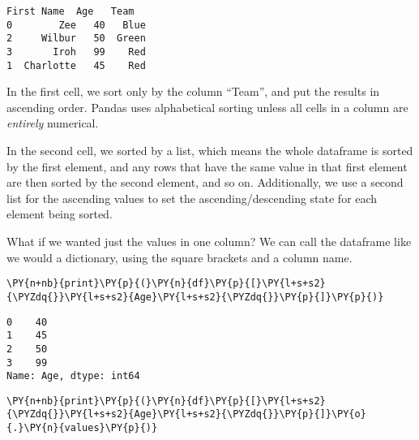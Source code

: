     
    \begin{Verbatim}[commandchars=\\\{\}]
  First Name  Age   Team
0        Zee   40   Blue
2     Wilbur   50  Green
3       Iroh   99    Red
1  Charlotte   45    Red
    \end{Verbatim}

    
    In the first cell, we sort only by the column ``Team'', and put the
results in ascending order. Pandas uses alphabetical sorting unless all
cells in a column are \emph{entirely} numerical.

In the second cell, we sorted by a list, which means the whole dataframe
is sorted by the first element, and any rows that have the same value in
that first element are then sorted by the second element, and so on.
Additionally, we use a second list for the ascending values to set the
ascending/descending state for each element being sorted.

What if we wanted just the values in one column? We can call the
dataframe like we would a dictionary, using the square brackets and a
column name.

    \begin{tcolorbox}[breakable, size=fbox, boxrule=1pt, pad at break*=1mm,colback=cellbackground, colframe=cellborder]
\begin{Verbatim}[commandchars=\\\{\}]
\PY{n+nb}{print}\PY{p}{(}\PY{n}{df}\PY{p}{[}\PY{l+s+s2}{\PYZdq{}}\PY{l+s+s2}{Age}\PY{l+s+s2}{\PYZdq{}}\PY{p}{]}\PY{p}{)}
\end{Verbatim}
\end{tcolorbox}

    \begin{Verbatim}[commandchars=\\\{\}]
0    40
1    45
2    50
3    99
Name: Age, dtype: int64
    \end{Verbatim}

    \begin{tcolorbox}[breakable, size=fbox, boxrule=1pt, pad at break*=1mm,colback=cellbackground, colframe=cellborder]
\begin{Verbatim}[commandchars=\\\{\}]
\PY{n+nb}{print}\PY{p}{(}\PY{n}{df}\PY{p}{[}\PY{l+s+s2}{\PYZdq{}}\PY{l+s+s2}{Age}\PY{l+s+s2}{\PYZdq{}}\PY{p}{]}\PY{o}{.}\PY{n}{values}\PY{p}{)}
\end{Verbatim}
\end{tcolorbox}


